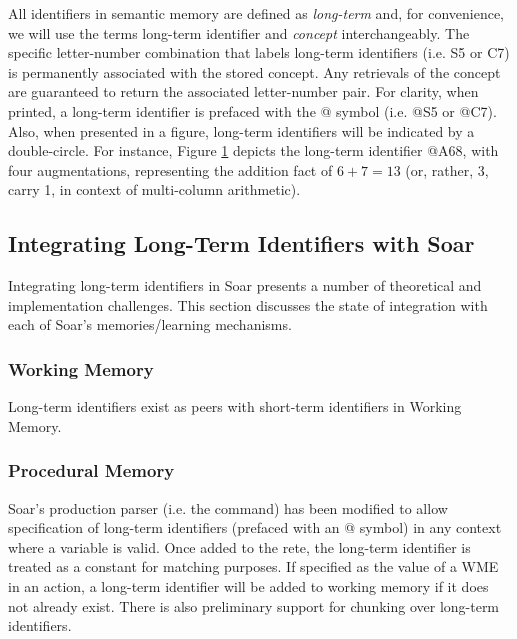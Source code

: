 All identifiers in semantic memory are defined as \emph{long-term} and, for convenience, we will use the terms long-term identifier and \emph{concept} interchangeably. The specific letter-number combination that labels long-term identifiers (i.e. S5 or C7) is permanently associated with the stored concept.  Any retrievals of the concept are guaranteed to return the associated letter-number pair.  For clarity, when printed, a long-term identifier is prefaced with the {@} symbol (i.e. {@}S5 or {@}C7). Also, when presented in a figure, long-term identifiers will be indicated by a double-circle. For instance, Figure \ref{fig:smem-concept} depicts the long-term identifier {@}A68, with four augmentations, representing the addition fact of ${6+7=13}$ (or, rather, 3, carry 1, in context of multi-column arithmetic).

\begin{figure}
\label{fig:smem-concept}
\end{figure}

\subsection{Integrating Long-Term Identifiers with Soar}
Integrating long-term identifiers in Soar presents a number of theoretical and implementation challenges.  This section discusses the state of integration with each of Soar's memories/learning mechanisms.

\subsubsection{Working Memory}
Long-term identifiers exist as peers with short-term identifiers in Working Memory.

\subsubsection{Procedural Memory}
Soar's production parser (i.e. the  command) has been modified to allow specification of long-term identifiers (prefaced with an {@} symbol) in any context where a variable is valid.  Once added to the rete, the long-term identifier is treated as a constant for matching purposes.  If specified as the value of a WME in an action, a long-term identifier will be added to working memory if it does not already exist.  There is also preliminary support for chunking over long-term identifiers.

